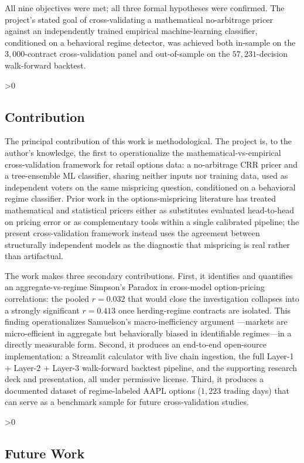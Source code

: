 \documentclass[12pt, letterpaper]{article}
\let\oldsubsection\subsection
\renewcommand{\subsection}{%
  \ifnum\value{subsection}>0 \clearpage\fi
  \oldsubsection
}
\begin{document}
All nine objectives were met; all three formal hypotheses were
confirmed. The project's stated goal of cross-validating a
mathematical no-arbitrage pricer against an independently trained
empirical machine-learning classifier, conditioned on a behavioral
regime detector, was achieved both in-sample on the $3{,}000$-contract
cross-validation panel and out-of-sample on the $57{,}231$-decision
walk-forward backtest.

\subsection{Contribution}

The principal contribution of this work is methodological. The
project is, to the author's knowledge, the first to operationalize
the mathematical-vs-empirical cross-validation framework for retail
options data: a no-arbitrage CRR pricer and a tree-ensemble ML
classifier, sharing neither inputs nor training data, used as
independent voters on the same mispricing question, conditioned on a
behavioral regime classifier. Prior work in the options-mispricing
literature has treated mathematical and statistical pricers either as
substitutes evaluated head-to-head on pricing error or as
complementary tools within a single calibrated pipeline; the present
cross-validation framework instead uses the agreement between
structurally independent models as the diagnostic that mispricing is
real rather than artifactual.

The work makes three secondary contributions. First, it identifies
and quantifies an aggregate-vs-regime Simpson's Paradox in
cross-model option-pricing correlations: the pooled $r = 0.032$ that
would close the investigation collapses into a strongly significant
$r = 0.413$ once herding-regime contracts are isolated. This finding
operationalizes Samuelson's macro-inefficiency argument
\citep{Fama1970}---markets are micro-efficient in aggregate but
behaviorally biased in identifiable regimes---in a directly
measurable form. Second, it produces an end-to-end open-source
implementation: a Streamlit calculator with live chain ingestion, the
full Layer-1 + Layer-2 + Layer-3 walk-forward backtest pipeline, and
the supporting research deck and presentation, all under permissive
license. Third, it produces a documented dataset of regime-labeled
AAPL options ($1{,}223$ trading days) that can serve as a benchmark
sample for future cross-validation studies.

\subsection{Future Work}
\end{document}
